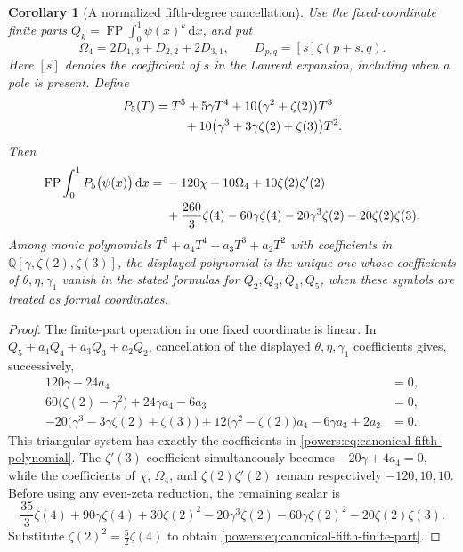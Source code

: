 \documentclass[11pt,a4paper]{article}
\numberwithin{equation}{section}
\newtheorem{corollary}[theorem]{Corollary}
\theoremstyle{definition}
\theoremstyle{remark}
\DeclareMathOperator{\FP}{FP}
\newcommand{\dd}{\mathrm d}
\begin{document}
\begin{corollary}[A normalized fifth-degree cancellation]
\label{powers:cor:canonical-fifth}
Use the fixed-coordinate finite parts
\(Q_k=\FP\int_0^1\psi(x)^k\,\dd x\), and put
\[
 \Omega_4=2D_{1,3}+D_{2,2}+2D_{3,1},
 \qquad D_{p,q}=[s]\zeta(p+s,q).
\]
Here \([s]\) denotes the coefficient of \(s\) in the Laurent
expansion, including when a pole is present. Define
\begin{align}
 P_5(T)={}&T^5+5\gamma T^4
      +10\bigl(\gamma^2+\zeta(2)\bigr)T^3\notag\\
 &\quad+10\bigl(\gamma^3+3\gamma\zeta(2)+\zeta(3)\bigr)T^2.
 \label{powers:eq:canonical-fifth-polynomial}
\end{align}
Then
\begin{align}
 \FP\int_0^1P_5\bigl(\psi(x)\bigr)\,\dd x
 ={}&-120\chi+10\Omega_4+10\zeta(2)\zeta'(2)\notag\\
 &+\frac{260}{3}\zeta(4)-60\gamma\zeta(4)
      -20\gamma^3\zeta(2)-20\zeta(2)\zeta(3).
 \label{powers:eq:canonical-fifth-finite-part}
\end{align}
Among monic polynomials
\(T^5+a_4T^4+a_3T^3+a_2T^2\) with coefficients in
\(\mathbb Q[\gamma,\zeta(2),\zeta(3)]\), the displayed polynomial is
the unique one whose coefficients of \(\theta,\eta,\gamma_1\)
vanish in the stated formulas for \(Q_2,Q_3,Q_4,Q_5\), when these
symbols are treated as formal coordinates.
\end{corollary}

\begin{proof}
The finite-part operation in one fixed coordinate is linear. In
\(Q_5+a_4Q_4+a_3Q_3+a_2Q_2\), cancellation of the displayed
\(\theta,\eta,\gamma_1\) coefficients gives, successively,
\begin{align*}
 120\gamma-24a_4&=0,\\
 60\bigl(\zeta(2)-\gamma^2\bigr)+24\gamma a_4-6a_3&=0,\\
 -20\bigl(\gamma^3-3\gamma\zeta(2)+\zeta(3)\bigr)
 +12\bigl(\gamma^2-\zeta(2)\bigr)a_4-6\gamma a_3+2a_2&=0.
\end{align*}
This triangular system has exactly the coefficients in
\eqref{powers:eq:canonical-fifth-polynomial}. The
\(\zeta'(3)\) coefficient simultaneously becomes
\(-20\gamma+4a_4=0\), while the coefficients of \(\chi\),
\(\Omega_4\), and \(\zeta(2)\zeta'(2)\) remain respectively
\(-120,10,10\). Before using any even-zeta reduction, the remaining
scalar is
\[
 \frac{35}{3}\zeta(4)+90\gamma\zeta(4)+30\zeta(2)^2
 -20\gamma^3\zeta(2)-60\gamma\zeta(2)^2
 -20\zeta(2)\zeta(3).
\]
Substitute \(\zeta(2)^2=\tfrac52\zeta(4)\) to obtain
\eqref{powers:eq:canonical-fifth-finite-part}.
\end{proof}
\end{document}
